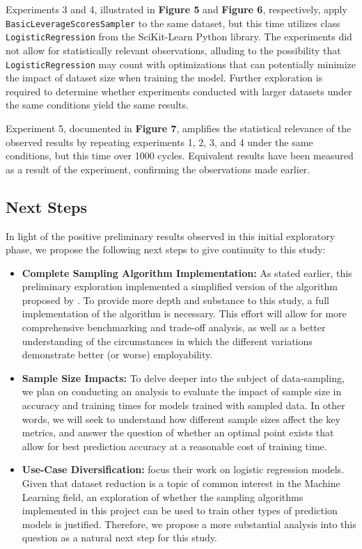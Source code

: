 \documentclass{article}
\theoremstyle{plain}
\theoremstyle{definition}
\theoremstyle{remark}
\begin{document}
Experiments 3 and 4, illustrated in \textbf{Figure 5} and \textbf{Figure 6}, respectively, apply \texttt{BasicLeverageScoresSampler} to the same dataset, but this time utilizes class \texttt{LogisticRegression} from the SciKit-Learn Python library. The experiments did not allow for statistically relevant observations, alluding to the possibility that \texttt{LogisticRegression} may count with optimizations that can potentially minimize the impact of dataset size when training the model. Further exploration is required to determine whether experiments conducted with larger datasets under the same conditions yield the same results.

Experiment 5, documented in \textbf{Figure 7}, amplifies the statistical relevance of the observed results by repeating experiments 1, 2, 3, and 4 under the same conditions, but this time over 1000 cycles. Equivalent results have been measured as a result of the experiment, confirming the observations made earlier.


\subsection{Next Steps}

In light of the positive preliminary results observed in this initial exploratory phase, we propose the following next steps to give continuity to this study:
\begin{itemize}

 \item \textbf{Complete Sampling Algorithm Implementation:} As stated earlier, this preliminary exploration implemented a simplified version of the algorithm proposed by \citeauthor{chow24}. To provide more depth and substance to this study, a full implementation of the algorithm is necessary. This effort will allow for more comprehensive benchmarking and trade-off analysis, as well as a better understanding of the circumstances in which the different variations demonstrate better (or worse) employability.

\item \textbf{Sample Size Impacts:} To delve deeper into the subject of data-sampling, we plan on conducting an analysis to evaluate the impact of sample size in accuracy and training times for models trained with sampled data. In other words, we will seek to understand how different sample sizes affect the key metrics, and answer the question of whether an optimal point exists that allow for best prediction accuracy at a reasonable cost of training time.

\item \textbf{Use-Case Diversification:} \citeauthor{chow24} focus their work on logistic regression models. Given that dataset reduction is a topic of common interest in the Machine Learning field, an exploration of whether the sampling algorithms implemented in this project can be used to train other types of prediction models is justified. Therefore, we propose a more substantial analysis into this question as a natural next step for this study.

\end{itemize}
\end{document}
